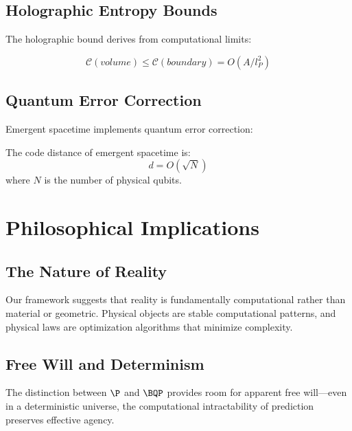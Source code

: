 \documentclass[12pt,a4paper]{article}
\newcommand{\comp}[1]{\mathcal{C}(#1)}
\begin{document}
\subsection{Holographic Entropy Bounds}

The holographic bound derives from computational limits:

\begin{theorem}
\begin{equation}
\comp{volume} \leq \comp{boundary} = O(A/l_P^2)
\end{equation}
\end{theorem}

\subsection{Quantum Error Correction}

Emergent spacetime implements quantum error correction:

\begin{proposition}
The code distance of emergent spacetime is:
\begin{equation}
d = O(\sqrt{N})
\end{equation}
where $N$ is the number of physical qubits.
\end{proposition}

\section{Philosophical Implications}

\subsection{The Nature of Reality}

Our framework suggests that reality is fundamentally computational rather than material or geometric. Physical objects are stable computational patterns, and physical laws are optimization algorithms that minimize complexity.

\subsection{Free Will and Determinism}

The distinction between $\P$ and $\BQP$ provides room for apparent free will—even in a deterministic universe, the computational intractability of prediction preserves effective agency.
\end{document}
